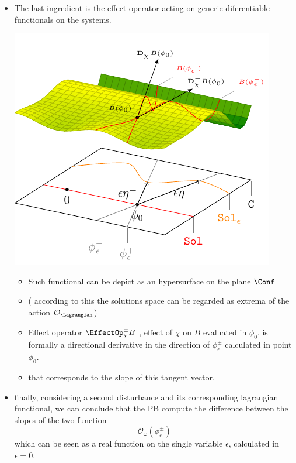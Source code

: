 \documentclass[a4paper,11pt]{scrartcl}
\begin{document}
\begin{itemize}
\item The last ingredient is the effect operator acting on generic diferentiable functionals on the systems.\\
		\begin{minipage}{0.4\textwidth}
			\includegraphics[width=\textwidth]{../Pictures/GeometricPicture3}
		\end{minipage}
		\begin{minipage}{0.5\textwidth}
			\begin{itemize}
				\item  Such functional can be depict as an hypersurface on the plane $\Conf$
				\item ( according to this the solutions space can be regarded as extrema of the action $\mathcal{O}_\Lagrangian$)
				\item Effect operator  $\EffectOp_\chi^\pm B$ , effect of $\chi$ on $B$ evaluated in $\phi_0$, is formally a directional derivative in the direction of $\phi_\epsilon^\pm$ calculated in point $\phi_0$.
				\item that corresponds to the slope of this tangent vector.
			\end{itemize}
		\end{minipage}
		\item finally, considering a second disturbance and its corresponding lagrangian functional, we can conclude that the PB compute the difference between the slopes of the two function $$\mathcal{O}_\omega ( \phi_\epsilon^\pm)$$ which can be seen as a real function on the single variable $\epsilon$, calculated in $\epsilon=0$.

\end{itemize}
\end{document}
